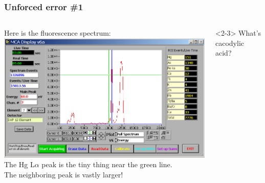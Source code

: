 \documentclass[10pt, xcolor=x11names, compress]{beamer}
\begin{document}
\begin{frame}
  \frametitle{Unforced error \#1}
  

  \begin{columns}
    \begin{column}{0.5\linewidth}
      Here is the fluorescence spectrum:\\[1ex]
      \includegraphics[width=\linewidth]{images/spectrum.png}\\[1ex]
      The Hg L$\alpha$ peak is the tiny thing near the green
      line.\\[1ex]
      The neighboring peak is vastly larger!
    \end{column}
    \begin{column}{0.5\linewidth}

      \begin{alertblock}<2-3>{}
        \centering What's cacodylic acid?
      \end{alertblock}

      \begin{center}
      \end{center}
    \end{column}
  \end{columns}

\end{frame}
\end{document}
